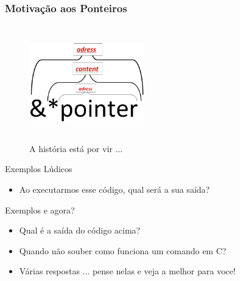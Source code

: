 \begin{frame}[allowframebreaks=0.9]

\frametitle{Motivação aos Ponteiros}
\begin{figure}[ht]
  \begin{center}

\includegraphics[height=5cm, width=5cm]{figs/fig_ponteiros/hierarq_pointer.png}

    \caption{A história está por vir ...}
  \end{center}
\end{figure}

\end{frame}


\begin{frame}{Exemplos Lúdicos}



\pause

\begin{itemize}
  \item Ao executarmos esse código, qual será a sua saída?
\end{itemize}
\end{frame}



\begin{frame}{Exemplos e agora?}



\pause



\pause
\begin{itemize}
  \item Qual é a saída do código acima? 
  \item Quando não souber como funciona um comando em C?
  \item Várias respostas ... pense nelas e veja a melhor para voce!

\end{itemize}
\end{frame}


